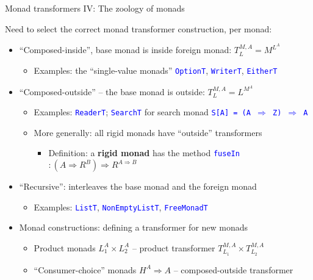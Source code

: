 \documentclass[english]{beamer}
\begin{document}
\begin{frame}{Monad transformers IV: The zoology of monads}

{\footnotesize{}\vspace{-0.2cm}}Need to select the correct monad
transformer construction, per monad:
\begin{itemize}
\item ``Composed-inside'', base monad is inside foreign monad: $T_{L}^{M,A}=M^{L^{A}}$
\begin{itemize}
\item Examples: the ``single-value monads'' \texttt{\textcolor{blue}{\footnotesize{}OptionT}},
\texttt{\textcolor{blue}{\footnotesize{}WriterT}}, \texttt{\textcolor{blue}{\footnotesize{}EitherT}} 
\end{itemize}
\item ``Composed-outside'' -- the base monad is outside: $T_{L}^{M,A}=L^{M^{A}}$
\begin{itemize}
\item Examples: \texttt{\textcolor{blue}{\footnotesize{}ReaderT}}; \texttt{\textcolor{blue}{\footnotesize{}SearchT}}
for search monad \texttt{\textcolor{blue}{\footnotesize{}S{[}A{]}
= (A $\Rightarrow$ Z) $\Rightarrow$ A}} 
\item More generally: all rigid monads have ``outside'' transformers
\begin{itemize}
\item Definition: a \textbf{rigid monad} has the method \texttt{\textcolor{blue}{\footnotesize{}fuseIn}}$:\left(A\Rightarrow R^{B}\right)\Rightarrow R^{A\Rightarrow B}$
\end{itemize}
\end{itemize}
\item ``Recursive'': interleaves the base monad and the foreign monad
\begin{itemize}
\item Examples: \texttt{\textcolor{blue}{\footnotesize{}ListT}}, \texttt{\textcolor{blue}{\footnotesize{}NonEmptyListT}},
\texttt{\textcolor{blue}{\footnotesize{}FreeMonadT}} 
\end{itemize}
\item Monad constructions: defining a transformer for new monads
\begin{itemize}
\item Product monads $L_{1}^{A}\times L_{2}^{A}$ -- product transformer
$T_{L_{1}}^{M,A}\times T_{L_{2}}^{M,A}$
\item ``Consumer-choice'' monads $H^{A}\Rightarrow A$ -- composed-outside
transformer

\end{itemize}
\end{itemize}
\end{frame}
\end{document}
